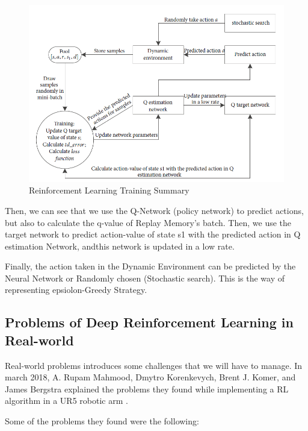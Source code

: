 			\begin{figure}
				\centering
				\includegraphics[width=1\linewidth]{Images/Training}
				\caption[RL Training]{Reinforcement Learning Training Summary}
				\label{fig:training}
			\end{figure}
		
			Then, we can see that we use the Q-Network (policy network) to predict actions, but also to calculate the q-value of Replay Memory's batch. Then, we use the target network to predict action-value of state s1 with the predicted action in Q estimation Network, andthis network is updated in a low rate.
			
			Finally, the action taken in the Dynamic Environment can be predicted by the Neural Network or Randomly chosen (Stochastic search). This is the way of representing epsiolon-Greedy Strategy. 
				
			
		
		
	\subsection{Problems of Deep Reinforcement Learning in Real-world}
		
		Real-world problems introduces some challenges that we will have to manage. In march 2018, A. Rupam Mahmood, Dmytro Korenkevych, Brent J. Komer, and James Bergstra explained the problems they found while implementing a RL algorithm in a UR5 robotic arm \cite{mahmood_setting_2018}.
		
		Some of the problems they found were the following:
		

